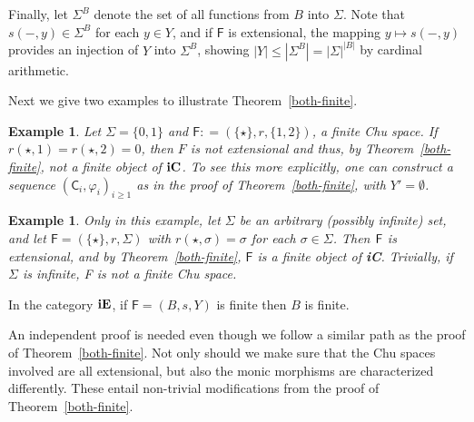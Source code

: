 \documentclass{LMCS}
\let\epf\endproof
\newtheorem{ex}[thm]{Example}
\begin{document}
Finally, let $\Sigma^B$ denote the set of all functions from $B$ into
$\Sigma$. Note that $s(-,y) \in \Sigma^B$ for each $y \in Y$, and if
$\mathsf{F}$ is extensional, the mapping $y \mapsto s(-,y)$ provides an
injection of $Y$ into $\Sigma^B$, showing $|Y| \leq |\Sigma^B| =
|\Sigma|^{|B|}$ by cardinal arithmetic. \epf


Next we give two examples to illustrate Theorem~\ref{both-finite}. 

\begin{ex}\label{finite-example}
  Let $\Sigma = \{0,1\}$ and $\mathsf{F} : = (\{\star\},r, \{1,2\})$, a
  finite Chu space. If $r(\star,1) = r(\star,2) = 0$, then $F$ is not
  extensional and thus, by Theorem~\ref{both-finite}, not a finite
  object of ${\bf iC}$. To see this more explicitly, one can
  construct a sequence $(\mathsf{C}_i, \varphi_i)_{i \geq 1}$ as in the
  proof of Theorem~\ref{both-finite}, with $Y'= \emptyset$. 
\end{ex}

\begin{ex}\label{ex:Sig-infinite}
  Only in this example, let $\Sigma$ be an arbitrary (possibly
  infinite) set, and let $\mathsf{F} = (\{\star\}, r , \Sigma)$ with
  $r(\star,\sigma) = \sigma$ for each $\sigma \in \Sigma$. Then ${\sf
    F}$ is extensional, and by Theorem~\ref{both-finite}, $\mathsf{F}$ is a
  finite object of {\bf iC}. Trivially, if $\Sigma$ is infinite, {\sf
    F} is not a finite Chu space. 
\end{ex}



\begin{thm}\label{finite-E-onlyif}
  In the category ${\bf iE}$, if $\mathsf{F}= (B, s, Y)$ is finite then $B$
  is finite. 
\end{thm}

An independent proof is needed even though we follow a similar path as the proof of Theorem~\ref{both-finite}. 
Not only should we make sure that the Chu spaces involved are all extensional, but also the
monic morphisms are characterized differently. 
These entail non-trivial modifications from  the proof of Theorem~\ref{both-finite}. 
\end{document}
